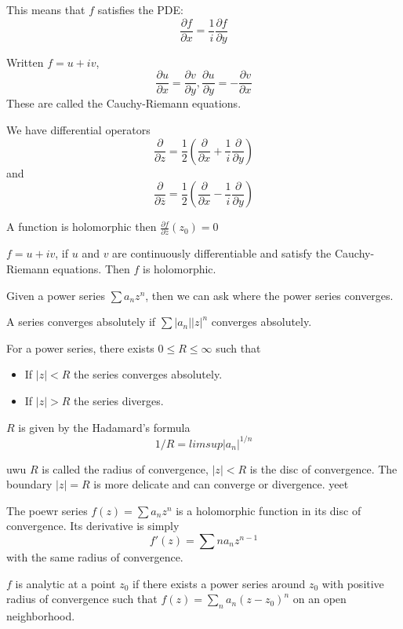\documentclass[main.tex]{subfiles}
\begin{document}
This means that $f$ satisfies the PDE:
$$
\frac{\partial f}{\partial x} = \frac{1}{i} \frac{\partial f}{\partial y}
$$

Written $f = u + iv$, 
$$
\frac{\partial u}{\partial x} = \frac{\partial v}{\partial y}, \frac{\partial u}{\partial y} = -\frac{\partial v}{\partial x}
$$
These are called the Cauchy-Riemann equations.

We have differential operators
$$
\frac{\partial}{\partial z} = \frac{1}{2} (\frac{\partial}{\partial x} + \frac{1}{i}\frac{\partial}{\partial y})
$$
and 
$$
\frac{\partial}{\partial \overline{z}} = \frac{1}{2} (\frac{\partial}{\partial x} - \frac{1}{i}\frac{\partial}{\partial y})
$$

A function is holomorphic then $\frac{\partial f}{\partial \overline{z}}(z_0) = 0$

\begin{theorem}
$f = u + iv$, if $u$ and $v$ are continuously differentiable and satisfy the Cauchy-Riemann equations. Then $f$ is holomorphic.
\end{theorem}

Given a power series $\sum a_n z^n$, then we can ask where the power series converges.

A series converges absolutely if $\sum|a_n||z|^n $ converges absolutely.

\begin{theorem}
For a power series, there exists $0 \leq R \leq \infty$ such that 
\begin{itemize}
    \item If $|z| < R$ the series converges absolutely.
    \item If $|z| > R$ the series diverges.
\end{itemize}
$R$ is given by the Hadamard's formula 
$$
1/R = lim sup |a_n|^{1/n}
$$
\end{theorem}
uwu
$R$ is called the radius of convergence, $|z| < R$ is the disc of convergence. The boundary $|z| = R$ is more delicate and can converge or divergence. yeet

\begin{theorem}
The poewr series $f(z) = \sum a_n z^n$ is a holomorphic function in its disc of convergence. Its derivative is simply 
$$
f'(z) = \sum n a_n z^{n-1}
$$
with the same radius of convergence.
\end{theorem}

$f$ is analytic at a point $z_0$ if there exists a power series around $z_0$ with positive radius of convergence such that $f(z) = \sum_n a_n (z - z_0)^n$ on an open neighborhood. 
\end{document}

